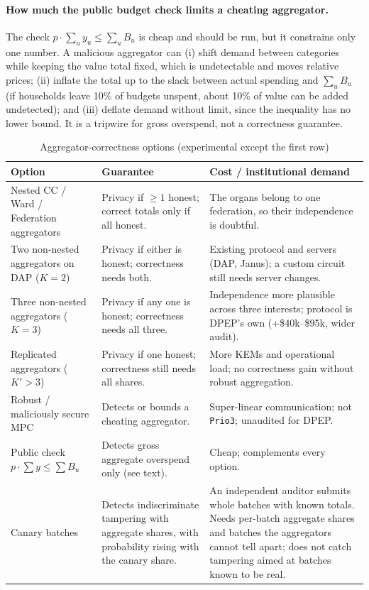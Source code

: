 \documentclass[10pt,twoside,openany]{book}
\theoremstyle{dpepstyle}
\begin{document}
\paragraph{How much the public budget check limits a cheating aggregator.}
The check $p\cdot\sum_u y_u \le \sum_u B_u$ is cheap and should be run, but it constrains only one number. A malicious aggregator can (i) shift demand between categories while keeping the value total fixed, which is undetectable and moves relative prices; (ii) inflate the total up to the slack between actual spending and $\sum_u B_u$ (if households leave 10\% of budgets unspent, about 10\% of value can be added undetected); and (iii) deflate demand without limit, since the inequality has no lower bound. It is a tripwire for gross overspend, not a correctness guarantee.

\begin{table}[htbp]
\centering
\caption{Aggregator-correctness options (experimental except the first row)}
\label{tab:agg-options}
\scriptsize
\begin{tabularx}{\textwidth}{L{1.30in} L{1.40in} Y}
\toprule
\textbf{Option} & \textbf{Guarantee} & \textbf{Cost / institutional demand} \\
\midrule
Nested CC / Ward / Federation aggregators & Privacy if $\ge 1$ honest; correct totals only if all honest. & The organs belong to one federation, so their independence is doubtful. \\
Two non-nested aggregators on DAP ($K=2$) & Privacy if either is honest; correctness needs both. & Existing protocol and servers (DAP, Janus); a custom circuit still needs server changes. \\
Three non-nested aggregators ($K=3$) & Privacy if any one is honest; correctness needs all three. & Independence more plausible across three interests; protocol is DPEP's own (+\$40k--\$95k, wider audit). \\
Replicated aggregators ($K'>3$) & Privacy if one honest; correctness still needs all shares. & More KEMs and operational load; no correctness gain without robust aggregation. \\
Robust / maliciously secure MPC & Detects or bounds a cheating aggregator. & Super-linear communication; not \texttt{Prio3}; unaudited for DPEP. \\
Public check $p\cdot\sum y \le \sum B_u$ & Detects gross aggregate overspend only (see text). & Cheap; complements every option. \\
Canary batches & Detects indiscriminate tampering with aggregate shares, with probability rising with the canary share. & An independent auditor submits whole batches with known totals. Needs per-batch aggregate shares and batches the aggregators cannot tell apart; does not catch tampering aimed at batches known to be real. \\

\end{tabularx}
\end{table}
\end{document}
